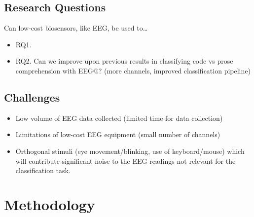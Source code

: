 \documentclass{IEEEtran}
\begin{document}
\begin{refsection}
\subsection{Research Questions}


Can low-cost biosensors, like EEG, be used to\ldots

\begin{itemize}
    \item RQ1. \RQmain{}
    \item RQ2. Can we improve upon previous results in classifying code vs prose comprehension with EEG@? (more channels, improved classification pipeline)
\end{itemize}

\subsection{Challenges}

\begin{itemize}
    \item Low volume of EEG data collected (limited time for data collection)
    \item Limitations of low-cost EEG equipment (small number of channels)
    \item Orthogonal stimuli (eye movement/blinking, use of keyboard/mouse) which will contribute significant noise to the EEG readings not relevant for the classification task.
\end{itemize}

\section{Methodology}


\end{refsection}
\end{document}
